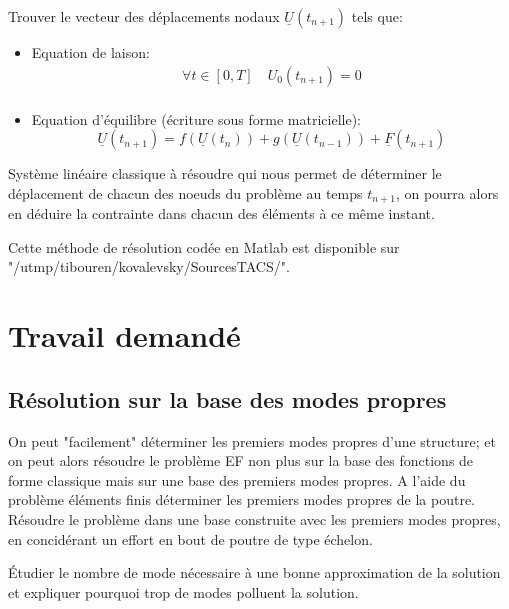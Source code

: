 \documentclass[fleqn]{article}
\begin{document}
\begin{it} 
	Trouver le vecteur des déplacements nodaux $\underline{U}(t_{n+1})$ tels que:
\end{it}
\begin{itemize}
	\item Equation de laison:
		\begin{equation*}
			\begin{array}{l}
				\forall t \in \left[0,T\right] \quad U_0(t_{n+1})=0\\
			\end{array}
		\end{equation*}
	\item Equation d'équilibre (écriture sous forme matricielle):
		\begin{equation*}
			\underline{U}(t_{n+1}) = f(\underline{U}(t_n))+g(\underline{U}(t_{n-1})) +\underline{F}(t_{n+1})
		\end{equation*}
\end{itemize}

Système linéaire classique à résoudre qui nous permet de déterminer le déplacement de chacun des noeuds du problème au temps $t_{n+1}$, on pourra alors en déduire la contrainte dans chacun des éléments à ce même instant.

Cette méthode de résolution codée en Matlab est disponible sur \\ "/utmp/tibouren/kovalevsky/SourcesTACS/".

\section{Travail demandé}

\subsection{Résolution sur la base des modes propres}

On peut "facilement" déterminer les premiers modes propres d'une structure; et on peut alors résoudre le problème EF non plus sur la base des fonctions de forme classique mais sur une base des premiers modes propres. 
A l'aide du problème éléments finis déterminer les premiers modes propres de la poutre. 
Résoudre le problème dans une base construite avec les premiers modes propres, en concidérant un effort en bout de poutre de type échelon.

 Étudier le nombre de mode nécessaire à une bonne approximation de la solution et expliquer pourquoi trop de modes polluent la solution. 
\end{document}
